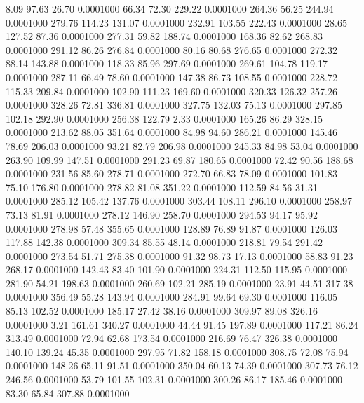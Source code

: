    8.09   97.63   26.70   0.0001000
  66.34   72.30  229.22   0.0001000
 264.36   56.25  244.94   0.0001000
 279.76  114.23  131.07   0.0001000
 232.91  103.55  222.43   0.0001000
  28.65  127.52   87.36   0.0001000
 277.31   59.82  188.74   0.0001000
 168.36   82.62  268.83   0.0001000
 291.12   86.26  276.84   0.0001000
  80.16   80.68  276.65   0.0001000
 272.32   88.14  143.88   0.0001000
 118.33   85.96  297.69   0.0001000
 269.61  104.78  119.17   0.0001000
 287.11   66.49   78.60   0.0001000
 147.38   86.73  108.55   0.0001000
 228.72  115.33  209.84   0.0001000
 102.90  111.23  169.60   0.0001000
 320.33  126.32  257.26   0.0001000
 328.26   72.81  336.81   0.0001000
 327.75  132.03   75.13   0.0001000
 297.85  102.18  292.90   0.0001000
 256.38  122.79    2.33   0.0001000
 165.26   86.29  328.15   0.0001000
 213.62   88.05  351.64   0.0001000
  84.98   94.60  286.21   0.0001000
 145.46   78.69  206.03   0.0001000
  93.21   82.79  206.98   0.0001000
 245.33   84.98   53.04   0.0001000
 263.90  109.99  147.51   0.0001000
 291.23   69.87  180.65   0.0001000
  72.42   90.56  188.68   0.0001000
 231.56   85.60  278.71   0.0001000
 272.70   66.83   78.09   0.0001000
 101.83   75.10  176.80   0.0001000
 278.82   81.08  351.22   0.0001000
 112.59   84.56   31.31   0.0001000
 285.12  105.42  137.76   0.0001000
 303.44  108.11  296.10   0.0001000
 258.97   73.13   81.91   0.0001000
 278.12  146.90  258.70   0.0001000
 294.53   94.17   95.92   0.0001000
 278.98   57.48  355.65   0.0001000
 128.89   76.89   91.87   0.0001000
 126.03  117.88  142.38   0.0001000
 309.34   85.55   48.14   0.0001000
 218.81   79.54  291.42   0.0001000
 273.54   51.71  275.38   0.0001000
  91.32   98.73   17.13   0.0001000
  58.83   91.23  268.17   0.0001000
 142.43   83.40  101.90   0.0001000
 224.31  112.50  115.95   0.0001000
 281.90   54.21  198.63   0.0001000
 260.69  102.21  285.19   0.0001000
  23.91   44.51  317.38   0.0001000
 356.49   55.28  143.94   0.0001000
 284.91   99.64   69.30   0.0001000
 116.05   85.13  102.52   0.0001000
 185.17   27.42   38.16   0.0001000
 309.97   89.08  326.16   0.0001000
   3.21  161.61  340.27   0.0001000
  44.44   91.45  197.89   0.0001000
 117.21   86.24  313.49   0.0001000
  72.94   62.68  173.54   0.0001000
 216.69   76.47  326.38   0.0001000
 140.10  139.24   45.35   0.0001000
 297.95   71.82  158.18   0.0001000
 308.75   72.08   75.94   0.0001000
 148.26   65.11   91.51   0.0001000
 350.04   60.13   74.39   0.0001000
 307.73   76.12  246.56   0.0001000
  53.79  101.55  102.31   0.0001000
 300.26   86.17  185.46   0.0001000
  83.30   65.84  307.88   0.0001000
